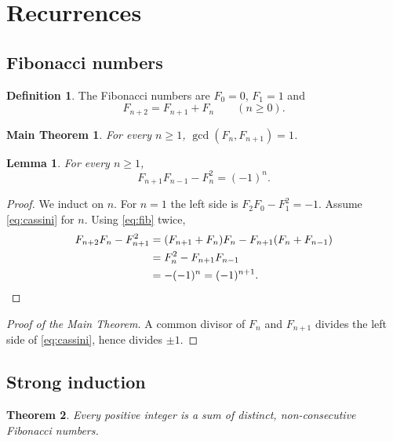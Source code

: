 \documentclass{article}
\newtheorem{theorem}{Theorem}[subsection]
\newtheorem{lemma}[theorem]{Lemma}
\newtheorem*{mainthm}{Main Theorem}
\theoremstyle{definition}
\newtheorem{definition}{Definition}[section]
\numberwithin{equation}{section}
\begin{document}
\section{Recurrences}

\subsection{Fibonacci numbers}

\begin{definition}
The Fibonacci numbers are $F_0 = 0$, $F_1 = 1$ and
\begin{equation}\label{eq:fib}
  F_{n+2} = F_{n+1} + F_n \qquad (n \ge 0).
\end{equation}
\end{definition}

\begin{mainthm}
For every $n \ge 1$, $\gcd(F_n, F_{n+1}) = 1$.
\end{mainthm}

\begin{lemma}\label{lem:cassini}
For every $n \ge 1$,
\begin{equation}\label{eq:cassini}
  F_{n+1}F_{n-1} - F_n^2 = (-1)^n.
\end{equation}
\end{lemma}

\begin{proof}
We induct on $n$. For $n = 1$ the left side is $F_2F_0 - F_1^2 = -1$.
Assume \eqref{eq:cassini} for $n$. Using \eqref{eq:fib} twice,
\begin{align}
  F_{n+2}F_n - F_{n+1}^2
    &= (F_{n+1} + F_n)F_n - F_{n+1}(F_n + F_{n-1}) \notag\\
    &= F_n^2 - F_{n+1}F_{n-1} \notag\\
    &= -(-1)^n = (-1)^{n+1}. \qedhere
\end{align}
\end{proof}

\begin{proof}[Proof of the Main Theorem]
A common divisor of $F_n$ and $F_{n+1}$ divides the left side of
\eqref{eq:cassini}, hence divides $\pm 1$.
\end{proof}

\subsection{Strong induction}

\begin{theorem}\label{thm:zeck}
Every positive integer is a sum of distinct, non-consecutive Fibonacci
numbers.
\end{theorem}
\end{document}
